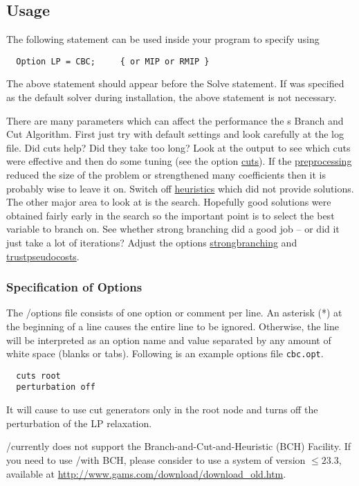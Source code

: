 \subsection{Usage}

The following statement can be used inside your \GAMS program to specify using \CBC
\begin{verbatim}
  Option LP = CBC;     { or MIP or RMIP }
\end{verbatim}

The above statement should appear before the Solve statement.
If \CBC was specified as the default solver during \GAMS installation, the above statement is not necessary.

There are many parameters which can affect the performance the \CBC{}s Branch and Cut Algorithm.
First just try with default settings and look carefully at the log file.
Did cuts help? Did they take too long? Look at the output to see which cuts were effective and then do some tuning (see the option \hyperlink{cuts}{cuts}).
If the \hyperlink{preprocess}{preprocessing} reduced the size of the problem or strengthened many coefficients then it is probably wise to leave it on.
Switch off \hyperlink{heuristics}{heuristics} which did not provide solutions.
The other major area to look at is the search.
Hopefully good solutions were obtained fairly early in the search so the important point is to select the best variable to branch on.
See whether strong branching did a good job -- or did it just take a lot of iterations?
Adjust the options \hyperlink{strongbranching}{strongbranching} and \hyperlink{trustpseudocosts}{trustpseudocosts}.

\subsubsection{Specification of Options}

The \GAMS/\CBC options file consists of one option or comment per line.
An asterisk (*) at the beginning of a line causes the entire line to be ignored.
Otherwise, the line will be interpreted as an option name and value separated by any amount of white space (blanks or tabs).
Following is an example options file \texttt{cbc.opt}.
\begin{verbatim}
  cuts root
  perturbation off
\end{verbatim}
It will cause \CBC to use cut generators only in the root node and turns off the perturbation of the LP relaxation.

\GAMS/\CBC currently does not support the \GAMS Branch-and-Cut-and-Heuristic (BCH) Facility.
If you need to use \GAMS/\CBC with BCH, please consider to use a \GAMS system of version $\leq 23.3$, available at \url{http://www.gams.com/download/download_old.htm}.

